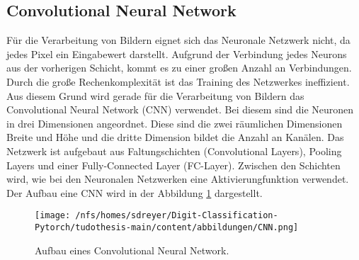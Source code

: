 \subsection{Convolutional Neural Network}

Für die Verarbeitung von Bildern eignet sich das Neuronale Netzwerk nicht, da jedes Pixel ein Eingabewert darstellt.
Aufgrund der Verbindung jedes Neurons aus der vorherigen Schicht, kommt es zu einer großen Anzahl an Verbindungen.
Durch die große Rechenkomplexität ist das Training des Netzwerkes ineffizient.
Aus diesem Grund wird gerade für die Verarbeitung von Bildern das Convolutional Neural Network (CNN) verwendet.
Bei diesem sind die Neuronen in drei Dimensionen angeordnet.
Diese sind die zwei räumlichen Dimensionen Breite und Höhe und die dritte Dimension bildet die Anzahl an Kanälen.
Das Netzwerk ist aufgebaut aus Faltungschichten (Convolutional Layers), Pooling Layers und einer Fully-Connected Layer (FC-Layer).
Zwischen den Schichten wird, wie bei den Neuronalen Netzwerken eine Aktivierungfunktion verwendet.~\cite{OShea} 
Der Aufbau eine CNN wird in der Abbildung \ref{fig:CNN} dargestellt.
\begin{figure}[htbp]
  \centering
  \texttt{[image: /nfs/homes/sdreyer/Digit-Classification-Pytorch/tudothesis-main/content/abbildungen/CNN.png]}
  \caption{Aufbau eines Convolutional Neural Network.~\cite{Mohammed2024}}
  \label{fig:CNN}
\end{figure}

